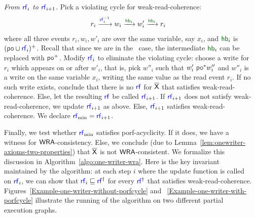 \noindent \emph{From $\rf_i$ to $\rf_{i+1}$.} Pick a violating cycle for weak-read-coherence:
\[ r_i \xra{\rf_{i}^{-1}} w_i \xra{\hb_i} w'_i \xra{\hb_i} r_i \]
where all three events $r_i, w_i, w'_i$ are over the same variable, say $x_i$, and $\hb_i$ is $(\po \cup \rf_i)^+$. Recall that since we are in the \onewriter\ case, the intermediate $\hb_i$ can be replaced with $\po^+$. Modify $\rf_i$ to eliminate the violating cycle: choose a write for $r_i$ which appears on or after $w'_i$, that is, pick $w''_i$ such that $w'_i~\po^* w''_i$ and $w''_i$ is a write on the same variable $x_i$, writing the same value as the read event $r_i$. If no such write exists, conclude that there is no $\rf$ for $\overline{\mathsf{\color{black}X}}$ that satisfies weak-read-coherence. Else, let the resulting $\rf$ be called $\rf_{i+1}$. If $\rf_{i+1}$ does not satisfy weak-read-coherence, we update $\rf_{i+1}$ as above. Else, $\rf_{i+1}$ satisfies weak-read-coherence. We declare $\rf_{\min} = \rf_{i+1}$.

Finally, we test whether $\rf_{\min}$ satisfies porf-acyclicity. If it does, we have a witness for $\mathsf{WRA}$-consistency. Else, we conclude (due to Lemma~\ref{lem:onewriter-axioms-two-properties}) that $\overline{\mathsf{\color{black}X}}$ is not $\mathsf{WRA}$-consistent. 
We formalize this discussion in Algorithm~\ref{algo:one-writer-wra}. Here is the key invariant maintained by the algorithm: at each step $i$ where the update function is called on $\rf_i$,  we can show that $\rf_i \sqsubseteq \rf^{\dagger}$ for every $\rf^\dagger$ that satisfies weak-read-coherence. Figures~\ref{Example-one-writer-without-porfcycle} and ~\ref{Example-one-writer-with-porfcycle} illustrate the running of the algorithm on two different partial execution graphs. 






